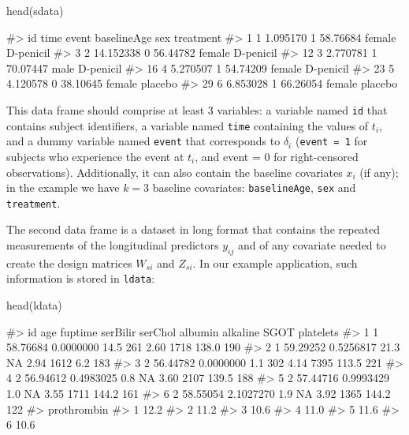 \begin{Schunk}
\begin{Sinput}
head(sdata)
\end{Sinput}
\begin{Soutput}
#>    id      time event baselineAge    sex treatment
#> 1   1  1.095170     1    58.76684 female D-penicil
#> 3   2 14.152338     0    56.44782 female D-penicil
#> 12  3  2.770781     1    70.07447   male D-penicil
#> 16  4  5.270507     1    54.74209 female D-penicil
#> 23  5  4.120578     0    38.10645 female   placebo
#> 29  6  6.853028     1    66.26054 female   placebo
\end{Soutput}
\end{Schunk}

This data frame should comprise at least 3 variables: a variable named
\texttt{id} that contains subject identifiers, a variable named
\texttt{time} containing the values of \(t_i\), and a dummy variable
named \texttt{event} that corresponds to \(\delta_i\)
(\texttt{event\ =\ 1} for subjects who experience the event at \(t_i\),
and event = 0 for right-censored observations). Additionally, it can
also contain the baseline covariates \(x_i\) (if any); in the example we
have \(k = 3\) baseline covariates: \texttt{baselineAge}, \texttt{sex}
and \texttt{treatment}.

The second data frame is a dataset in long format that contains the
repeated measurements of the longitudinal predictors \(y_{ij}\) and of
any covariate needed to create the design matrices \(W_{si}\) and
\(Z_{si}\). In our example application, such information is stored in
\texttt{ldata}:

\begin{Schunk}
\begin{Sinput}
head(ldata)
\end{Sinput}
\begin{Soutput}
#>   id      age   fuptime serBilir serChol albumin alkaline  SGOT platelets
#> 1  1 58.76684 0.0000000     14.5     261    2.60     1718 138.0       190
#> 2  1 59.29252 0.5256817     21.3      NA    2.94     1612   6.2       183
#> 3  2 56.44782 0.0000000      1.1     302    4.14     7395 113.5       221
#> 4  2 56.94612 0.4983025      0.8      NA    3.60     2107 139.5       188
#> 5  2 57.44716 0.9993429      1.0      NA    3.55     1711 144.2       161
#> 6  2 58.55054 2.1027270      1.9      NA    3.92     1365 144.2       122
#>   prothrombin
#> 1        12.2
#> 2        11.2
#> 3        10.6
#> 4        11.0
#> 5        11.6
#> 6        10.6
\end{Soutput}
\end{Schunk}

